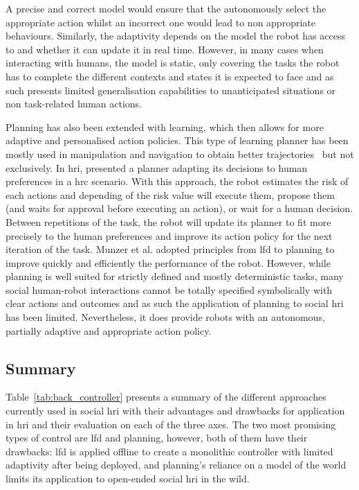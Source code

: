     A precise and correct model would ensure that the autonomously select the appropriate action whilst an incorrect one would lead to non appropriate behaviours. Similarly, the adaptivity depends on the model the robot has access to and whether it can update it in real time. However, in many cases when interacting with humans, the model is static, only covering the tasks the robot has to complete the different contexts and states it is expected to face and as such presents limited generalisation capabilities to unanticipated situations or non task-related human actions.
    
    Planning has also been extended with learning, which then allows for more adaptive and personalised action policies. This type of learning planner has been mostly used in manipulation and navigation to obtain better trajectories~\citep{jain2013learning,beetz2004rpllearn} but not exclusively. In \gls{hri}, \cite{munzer2017efficient} presented a planner adapting its decisions to human preferences in a \gls{hrc} scenario. With this approach, the robot estimates the risk of each actions and depending of the risk value will execute them, propose them (and waits for approval before executing an action), or wait for a human decision. Between repetitions of the task, the robot will update its planner to fit more precisely to the human preferences and improve its action policy for the next iteration of the task. Munzer et al. adopted principles from \gls{lfd} to planning to improve quickly and efficiently the performance of the robot. However, while planning is well suited for strictly defined and mostly deterministic tasks, many social human-robot interactions cannot be totally specified symbolically with clear actions and outcomes and as such the application of planning to social \gls{hri} has been limited. Nevertheless, it does provide robots with an autonomous, partially adaptive and appropriate action policy.
		
\subsection{Summary}

	Table~\ref{tab:back_controller} presents a summary of the different approaches currently used in social \gls{hri} with their advantages and drawbacks for application in \gls{hri} and their evaluation on each of the three axes. The two most promising types of control are \gls{lfd} and planning, however, both of them have their drawbacks: \gls{lfd} is applied offline to create a monolithic controller with limited adaptivity after being deployed, and planning's reliance on a model of the world limits its application to open-ended social \gls{hri} in the wild.
	
